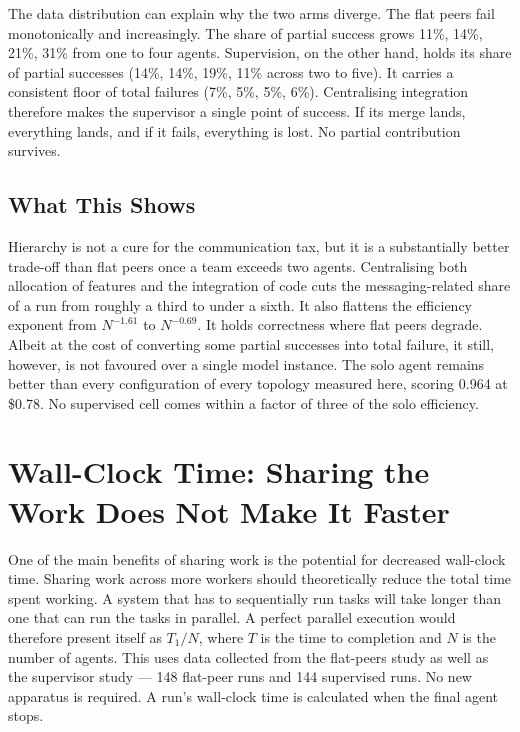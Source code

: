 \documentclass[11pt,a4paper]{article}
\begin{document}
The data distribution can explain why the two arms diverge. The flat peers fail monotonically and increasingly. The share of partial success grows 11\%, 14\%, 21\%, 31\% from one to four agents. Supervision, on the other hand, holds its share of partial successes (14\%, 14\%, 19\%, 11\% across two to five). It carries a consistent floor of total failures (7\%, 5\%, 5\%, 6\%). Centralising integration therefore makes the supervisor a single point of success. If its merge lands, everything lands, and if it fails, everything is lost. No partial contribution survives.

\FloatBarrier
\subsection{What This Shows}\label{sec:supshows}

Hierarchy is not a cure for the communication tax, but it is a substantially better trade-off than flat peers once a team exceeds two agents. Centralising both allocation of features and the integration of code cuts the messaging-related share of a run from roughly a third to under a sixth. It also flattens the efficiency exponent from $N^{-1.61}$ to $N^{-0.69}$. It holds correctness where flat peers degrade. Albeit at the cost of converting some partial successes into total failure, it still, however, is not favoured over a single model instance. The solo agent remains better than every configuration of every topology measured here, scoring 0.964 at \$0.78. No supervised cell comes within a factor of three of the solo efficiency.

%
%
\FloatBarrier
\section{Wall-Clock Time: Sharing the Work Does Not Make It Faster}\label{sec:wallclock}

One of the main benefits of sharing work is the potential for decreased wall-clock time. Sharing work across more workers should theoretically reduce the total time spent working. A system that has to sequentially run tasks will take longer than one that can run the tasks in parallel. A perfect parallel execution would therefore present itself as $T_1/N$, where $T$ is the time to completion and $N$ is the number of agents. This uses data collected from the flat-peers study as well as the supervisor study --- 148 flat-peer runs and 144 supervised runs. No new apparatus is required. A run's wall-clock time is calculated when the final agent stops.
\end{document}
